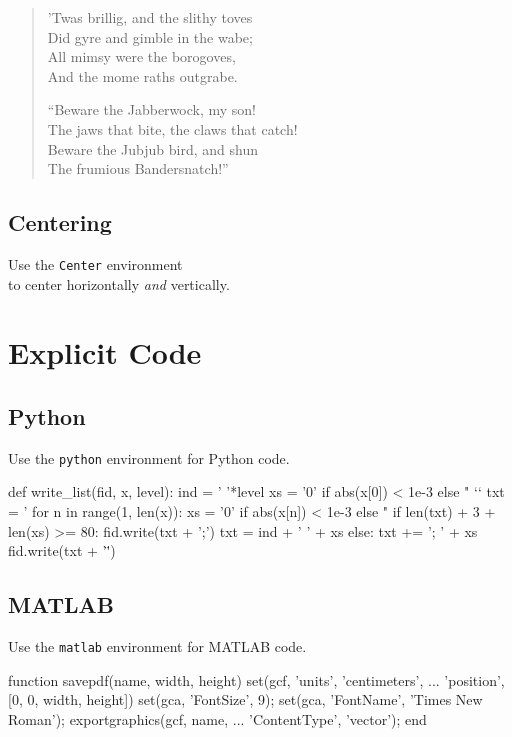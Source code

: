 \documentclass{afitdefense}
\begin{document}
{    \begin{verse}
        'Twas brillig, and the slithy toves\\
        Did gyre and gimble in the wabe;\\
        All mimsy were the borogoves,\\
        And the mome raths outgrabe.

        ``Beware the Jabberwock, my son!\\
        The jaws that bite, the claws that catch!\\
        Beware the Jubjub bird, and shun\\
        The frumious Bandersnatch!''
    \end{verse}
}

\section{Centering}

\begin{Center}
    \Large Use the \texttt{Center} environment \\
    to center horizontally \emph{and} vertically.
\end{Center}

\chapter{Explicit Code}

\section{Python}\onecolumn

Use the \verb|python| environment for Python code.
\begin{python}
def write_list(fid, x, level):
    ind = '  '*level
    xs = '0' if abs(x[0]) < 1e-3 else "%
`\HL`    txt = '\n%
    for n in range(1, len(x)):
        xs = '0' if abs(x[n]) < 1e-3 else "%
        if len(txt) + 3 + len(xs) >= 80:
            fid.write(txt + ';\n')
            txt = ind + '  ' + xs
        else:
            txt += '; ' + xs
    fid.write(txt + '\"')
\end{python}

\section{MATLAB}

Use the \verb|matlab| environment for MATLAB code.
\begin{matlab}
function savepdf(name, width, height)
    set(gcf, 'units', 'centimeters', ...
        'position', [0, 0, width, height])
    set(gca, 'FontSize', 9);
    set(gca, 'FontName', 'Times New Roman');
    exportgraphics(gcf, name, ...
        'ContentType', 'vector');
end
\end{matlab}
\end{document}
